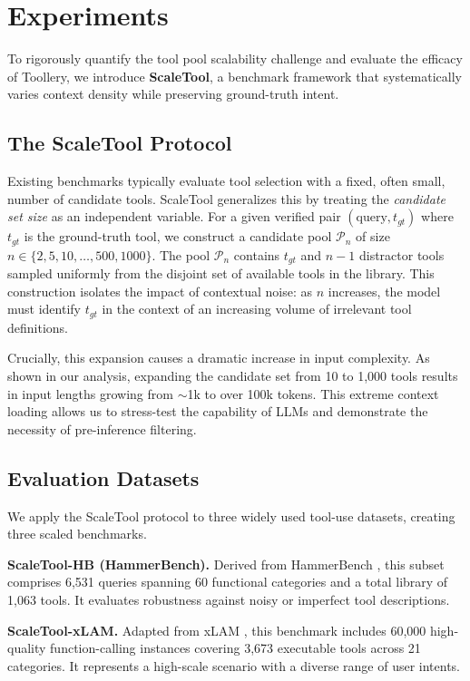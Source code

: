 \documentclass[11pt]{article}
\begin{document}
\section{Experiments}


To rigorously quantify the tool pool scalability challenge and evaluate the efficacy of Toollery, we introduce \textbf{ScaleTool}, a benchmark framework that systematically varies context density while preserving ground-truth intent.

\subsection{The ScaleTool Protocol}
Existing benchmarks typically evaluate tool selection with a fixed, often small, number of candidate tools. ScaleTool generalizes this by treating the \textit{candidate set size} as an independent variable. For a given verified pair $(\text{query}, t_{gt})$ where $t_{gt}$ is the ground-truth tool, we construct a candidate pool $\mathcal{P}_n$ of size $n \in \{2, 5, 10, \dots, 500, 1000\}$. The pool $\mathcal{P}_n$ contains $t_{gt}$ and $n-1$ distractor tools sampled uniformly from the disjoint set of available tools in the library. This construction isolates the impact of contextual noise: as $n$ increases, the model must identify $t_{gt}$ in the context of an increasing volume of irrelevant tool definitions.

Crucially, this expansion causes a dramatic increase in input complexity. As shown in our analysis, expanding the candidate set from 10 to 1,000 tools results in input lengths growing from $\sim$1k to over 100k tokens. This extreme context loading allows us to stress-test the capability of LLMs and demonstrate the necessity of pre-inference filtering.

\subsection{Evaluation Datasets}
We apply the ScaleTool protocol to three widely used tool-use datasets, creating three scaled benchmarks.


\textbf{ScaleTool-HB (HammerBench).} Derived from HammerBench \cite{wang2025hammerbench}, this subset comprises 6,531 queries spanning 60 functional categories and a total library of 1,063 tools. It evaluates robustness against noisy or imperfect tool descriptions.

\textbf{ScaleTool-xLAM.} Adapted from xLAM \cite{liu2024apigen}, this benchmark includes 60,000 high-quality function-calling instances covering 3,673 executable tools across 21 categories. It represents a high-scale scenario with a diverse range of user intents.
\end{document}
